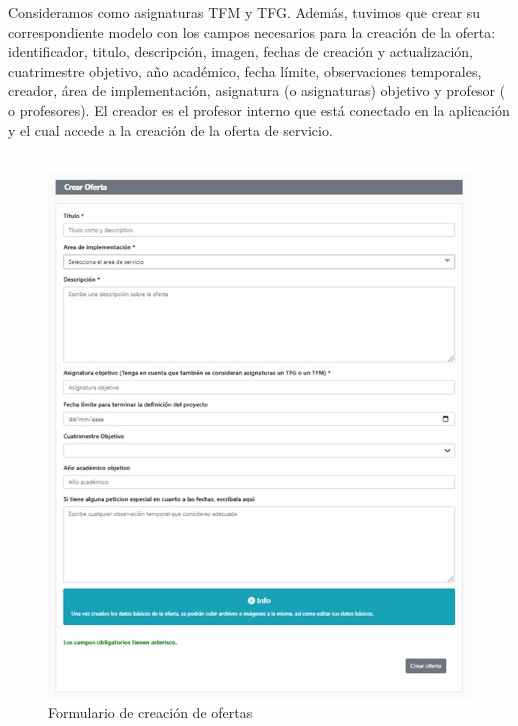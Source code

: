 \documentclass[11pt]{book}
\begin{document}
	Consideramos como asignaturas TFM y TFG.
	Además, tuvimos que crear su correspondiente modelo con los campos necesarios para la creación de la oferta: identificador, titulo, descripción, imagen, fechas de creación y actualización, cuatrimestre objetivo, año académico, fecha límite, observaciones temporales, creador, área de implementación, asignatura (o asignaturas) objetivo y profesor ( o profesores). El creador es el profesor interno que está conectado en la aplicación y el cual accede a la creación de la oferta de servicio.\\\\
	\begin{figure}[t]
		\centering
		\includegraphics[scale=0.9]{oferta}
		\caption{Formulario de creación de ofertas}
	\end{figure}
\end{document}
